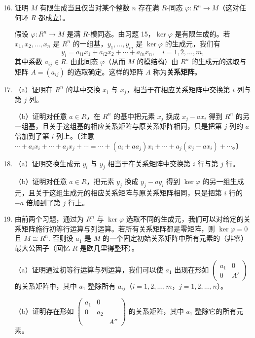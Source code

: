 \begin{enumerate}
\setcounter{enumi}{15}
\item 证明 \(M\) 有限生成当且仅当对某个整数 \(n\) 存在满 \(R\)-同态 \(\varphi : R^n \to M\)（这对任何环 \(R\) 都成立）。

\noindent 假设 \(\varphi : R^n \to M\) 是满 \(R\)-模同态。由习题 15，\(\ker\varphi\) 是有限生成的。若 \(x_1, x_2, \ldots, x_n\) 是 \(R^n\) 的一组基，\(y_1, \ldots, y_m\) 是 \(\ker\varphi\) 的生成元，我们有
\[
y_i = a_{i1}x_1+a_{i2}x_2+\cdots+a_{in}x_n, \quad i = 1, 2, \ldots, m,
\]
其中系数 \(a_{ij} \in R\). 由此同态 \(\varphi\)（从而 \(M\) 的模结构）由 \(R^n\) 的生成元的选取与矩阵 \(A = (a_{ij})\) 的选取确定。这样的矩阵 \(A\) 称为\textbf{关系矩阵}。

\item （a）证明在 \(R^n\) 的基中交换 \(x_i\) 与 \(x_j\)，相当于在相应关系矩阵中交换第 \(i\) 列与第 \(j\) 列。

（b）证明对任意 \(a \in R\)，在 \(R^n\) 的基中把元素 \(x_j\) 换成 \(x_j-ax_i\) 得到 \(R^n\) 的另一组基，且关于这组基的相应关系矩阵与原关系矩阵相同，只是把第 \(j\) 列的 \(a\) 倍加到了第 \(i\) 列上。〔注意 \(\cdots+a_ix_i+\cdots+a_jx_j+\cdots = \cdots+(a_i+aa_j)x_i+\cdots+a_j(x_j-ax_i)+\cdots\)。〕

\item （a）证明交换生成元 \(y_i\) 与 \(y_j\) 相当于在关系矩阵中交换第 \(i\) 行与第 \(j\) 行。

（b）证明对任意 \(a \in R\)，把元素 \(y_j\) 换成 \(y_j-ay_i\) 得到 \(\ker\varphi\) 的另一组生成元，且关于这组生成元的相应关系矩阵与原关系矩阵相同，只是把第 \(i\) 行的 \(-a\) 倍加到了第 \(j\) 行上。

\item 由前两个习题，通过为 \(R^n\) 与 \(\ker\varphi\) 选取不同的生成元，我们可以对给定的关系矩阵施行初等行运算与列运算。若所有关系矩阵都是零矩阵，则 \(\ker\varphi = 0\) 且 \(M \cong R^n\). 否则设 \(a_1\) 是 \(M\) 的一个固定初始关系矩阵中所有元素的（非零）最大公因子（回忆 \(R\) 是欧几里得整环）。

（a）证明通过初等行运算与列运算，我们可以使 \(a_1\) 出现在形如 \(\begin{pmatrix} a_1 & 0 \\ 0 & A' \end{pmatrix}\) 的关系矩阵中，其中 \(a_1\) 整除所有 \(a_{ij}\)（\(i = 1, 2, \ldots, m\)，\(j = 1, 2, \ldots, n\)）。

（b）证明存在形如 \(\begin{pmatrix} a_1 & 0 \\ 0 & a_2 \\ & & A''\end{pmatrix}\) 的关系矩阵，其中 \(a_1\) 整除它的所有元素。


\end{enumerate}
